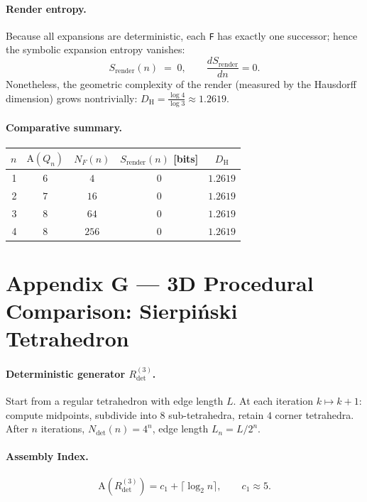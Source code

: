 \documentclass[12pt,a4paper]{article}
\theoremstyle{plain}
\theoremstyle{definition}
\theoremstyle{remark}
\newcommand{\Sfield}{S}
\newcommand{\AI}{\mathrm{A}}
\begin{document}
\paragraph{Render entropy.}
Because all expansions are deterministic, each \texttt{F} has exactly one successor; hence the symbolic expansion entropy vanishes:
\[
\Sfield_{\mathrm{render}}(n)\;=\;0, \qquad \frac{d\Sfield_{\mathrm{render}}}{dn}=0.
\]
Nonetheless, the geometric complexity of the render (measured by the Hausdorff dimension) grows nontrivially: $D_\mathrm{H} = \frac{\log 4}{\log 3} \approx 1.2619$.

\paragraph{Comparative summary.}
\begin{center}
\renewcommand{\arraystretch}{1.2}
\begin{tabular}{@{}rcccc@{}}
\toprule
$n$ & $\AI(Q_n)$ & $N_F(n)$ & $\Sfield_{\text{render}}(n)$ [bits] & $D_\mathrm{H}$ \\
\midrule
1 & $6$ & $4$ & $0$ & $1.2619$ \\
2 & $7$ & $16$ & $0$ & $1.2619$ \\
3 & $8$ & $64$ & $0$ & $1.2619$ \\
4 & $8$ & $256$ & $0$ & $1.2619$ \\
\bottomrule
\end{tabular}
\end{center}

\section{Appendix G — 3D Procedural Comparison: Sierpiński Tetrahedron}
\label{app:sierpinski-3d}

\paragraph{Deterministic generator $R^{(3)}_{\mathrm{det}}$.}
Start from a regular tetrahedron with edge length $L$. At each iteration $k\mapsto k{+}1$: compute midpoints, subdivide into $8$ sub-tetrahedra, retain $4$ corner tetrahedra. After $n$ iterations, $N_{\mathrm{det}}(n)=4^{n}$, edge length $L_n=L/2^{n}$.

\paragraph{Assembly Index.}
\[
\AI(R^{(3)}_{\mathrm{det}})=c_1+\lceil\log_2 n\rceil, \qquad c_1\approx 5.
\]
\end{document}
